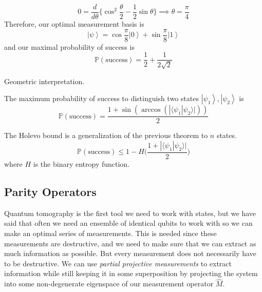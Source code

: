 \documentclass{article}
\newcommand{\ket}[1]{\ensuremath{\left|#1\right\rangle}}
\newcommand{\braket}[2]{\langle #1 | #2 \rangle}
\begin{document}
\begin{example}
      \begin{equation}
        0 = \frac{d}{d\theta} \bigg\{ \cos^2 \frac{\theta}{2} - \frac{1}{2} \sin{\theta} \bigg\} \implies  \theta = \frac{\pi}{4}
      \end{equation}
      Therefore, our optimal measurement basis is 
      \begin{equation}
        \ket{\psi} = \cos\frac{\pi}{8} \ket{0} + \sin\frac{\pi}{8} \ket{1} 
      \end{equation}
      and our maximal probability of success is 
      \begin{equation}
        \mathbb{P}(\text{success}) = \frac{1}{2} + \frac{1}{2 \sqrt{2}}
      \end{equation}
    \end{example}

    Geometric interpretation. 

    \begin{theorem}[]
      The maximum probability of success to distinguish two states $\ket{\psi_1}, \ket{\psi_2}$ is 
      \begin{equation}
        \mathbb{P}(\text{success}) = \frac{1 + \sin(\arccos(|\braket{\psi_1}{\psi_2}|))}{2}
      \end{equation}
    \end{theorem}

    \begin{theorem}
      The Holevo bound is a generalization of the previous theorem to $n$ states. 
      \begin{equation}
        \mathbb{P}(\text{success}) \leq 1 - H\bigg( \frac{1 + |\braket{\psi_1}{\psi_2}|}{2} \bigg)
      \end{equation}
      where $H$ is the binary entropy function.
    \end{theorem}

  \subsection{Parity Operators}

    Quantum tomography is the first tool we need to work with states, but we have said that often we need an ensemble of identical qubits to work with so we can make an optimal series of measurements. This is needed since these measurements are destructive, and we need to make sure that we can extract as much information as possible. But every measurement does not necessarily have to be destructive. We can use \textit{partial projective measurements} to extract information while still keeping it in some superposition by projecting the system into some non-degenerate eigenspace of our measurement operator $\hat{M}$. 
\end{document}

